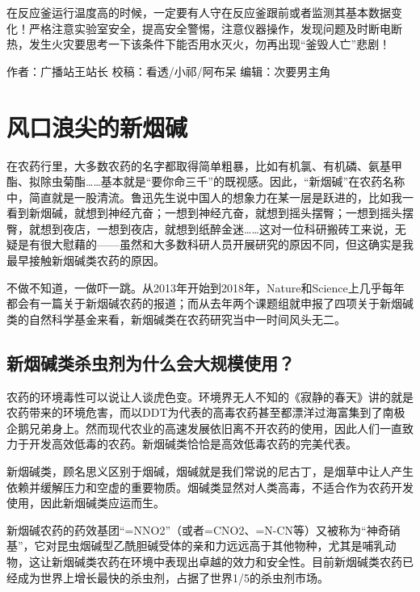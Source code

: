 \documentclass[]{book}
\begin{document}
在反应釜运行温度高的时候，一定要有人守在反应釜跟前或者监测其基本数据变化！严格注意实验室安全，提高安全警惕，注意仪器操作，发现问题及时断电断热，发生火灾要思考一下该条件下能否用水灭火，勿再出现``釜毁人亡''悲剧！

作者：广播站王站长
校稿：看透/小祁/阿布呆
编辑：次要男主角

\hypertarget{ux98ceux53e3ux6d6aux5c16ux7684ux65b0ux70dfux78b1}{%
\section{风口浪尖的新烟碱}\label{ux98ceux53e3ux6d6aux5c16ux7684ux65b0ux70dfux78b1}}

在农药行里，大多数农药的名字都取得简单粗暴，比如有机氯、有机磷、氨基甲酯、拟除虫菊酯\ldots{}\ldots{}基本就是``要你命三千''的既视感。因此，``新烟碱''在农药名称中，简直就是一股清流。鲁迅先生说中国人的想象力在某一层是跃进的，比如我一看到新烟碱，就想到神经亢奋；一想到神经亢奋，就想到摇头摆臀；一想到摇头摆臀，就想到夜店，一想到夜店，就想到纸醉金迷\ldots{}\ldots{}这对一位科研搬砖工来说，无疑是有很大慰藉的------虽然和大多数科研人员开展研究的原因不同，但这确实是我最早接触新烟碱类农药的原因。

不做不知道，一做吓一跳。从2013年开始到2018年，Nature和Science上几乎每年都会有一篇关于新烟碱农药的报道；而从去年两个课题组就申报了四项关于新烟碱类的自然科学基金来看，新烟碱类在农药研究当中一时间风头无二。

\hypertarget{ux65b0ux70dfux78b1ux7c7bux6740ux866bux5242ux4e3aux4ec0ux4e48ux4f1aux5927ux89c4ux6a21ux4f7fux7528}{%
\subsection{新烟碱类杀虫剂为什么会大规模使用？}\label{ux65b0ux70dfux78b1ux7c7bux6740ux866bux5242ux4e3aux4ec0ux4e48ux4f1aux5927ux89c4ux6a21ux4f7fux7528}}

农药的环境毒性可以说让人谈虎色变。环境界无人不知的《寂静的春天》讲的就是农药带来的环境危害，而以DDT为代表的高毒农药甚至都漂洋过海富集到了南极企鹅兄弟身上。然而现代农业的高速发展依旧离不开农药的使用，因此人们一直致力于开发高效低毒的农药。新烟碱类恰恰是高效低毒农药的完美代表。

新烟碱类，顾名思义区别于烟碱，烟碱就是我们常说的尼古丁，是烟草中让人产生依赖并缓解压力和空虚的重要物质。烟碱类显然对人类高毒，不适合作为农药开发使用，因此新烟碱类应运而生。

新烟碱农药的药效基团``=NNO2''（或者=CNO2、=N-CN等）又被称为``神奇硝基''，它对昆虫烟碱型乙酰胆碱受体的亲和力远远高于其他物种，尤其是哺乳动物，这让新烟碱类农药在环境中表现出卓越的效力和安全性。目前新烟碱类农药已经成为世界上增长最快的杀虫剂，占据了世界1/5的杀虫剂市场。
\end{document}
